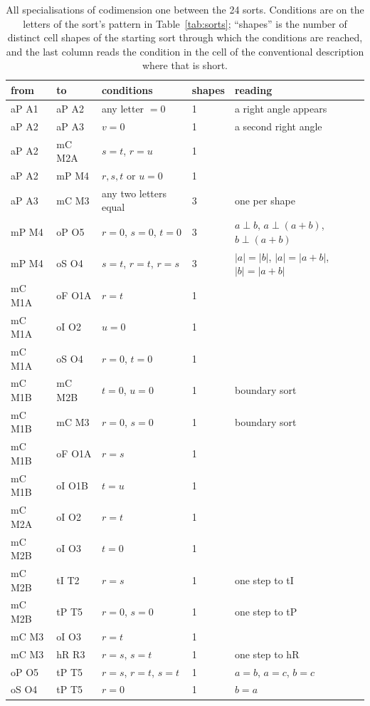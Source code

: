 \documentclass[preprint,pdf]{iucr}          %
\begin{document}
\begin{table}
\caption{All specialisations of codimension one between the 24 sorts. Conditions are on the letters of the sort's pattern in Table~\ref{tab:sorts}; ``shapes'' is the number of distinct cell shapes of the starting sort through which the conditions are reached, and the last column reads the condition in the cell of the conventional description where that is short.}
\label{tab:special}
\begin{footnotesize}
\begin{tabular}{llllp{4.6cm}}
\toprule
from & to & conditions & shapes & reading \\
\midrule
aP A1 & aP A2 & any letter $=0$ & 1 & a right angle appears \\
aP A2 & aP A3 & $v=0$ & 1 & a second right angle \\
aP A2 & mC M2A & $s=t$, $r=u$ & 1 & \\
aP A2 & mP M4 & $r,s,t$ or $u=0$ & 1 & \\
aP A3 & mC M3 & any two letters equal & 3 & one per shape \\
mP M4 & oP O5 & $r=0$, $s=0$, $t=0$ & 3 & $a\perp b$, $a\perp(a+b)$, $b\perp(a+b)$ \\
mP M4 & oS O4 & $s=t$, $r=t$, $r=s$ & 3 & $|a|=|b|$, $|a|=|a+b|$, $|b|=|a+b|$ \\
mC M1A & oF O1A & $r=t$ & 1 & \\
mC M1A & oI O2 & $u=0$ & 1 & \\
mC M1A & oS O4 & $r=0$, $t=0$ & 1 & \\
mC M1B & mC M2B & $t=0$, $u=0$ & 1 & boundary sort \\
mC M1B & mC M3 & $r=0$, $s=0$ & 1 & boundary sort \\
mC M1B & oF O1A & $r=s$ & 1 & \\
mC M1B & oI O1B & $t=u$ & 1 & \\
mC M2A & oI O2 & $r=t$ & 1 & \\
mC M2B & oI O3 & $t=0$ & 1 & \\
mC M2B & tI T2 & $r=s$ & 1 & one step to tI \\
mC M2B & tP T5 & $r=0$, $s=0$ & 1 & one step to tP \\
mC M3 & oI O3 & $r=t$ & 1 & \\
mC M3 & hR R3 & $r=s$, $s=t$ & 1 & one step to hR \\
oP O5 & tP T5 & $r=s$, $r=t$, $s=t$ & 1 & $a=b$, $a=c$, $b=c$ \\
oS O4 & tP T5 & $r=0$ & 1 & $b=a$ \\

\end{tabular}
\end{footnotesize}
\end{table}
\end{document}
